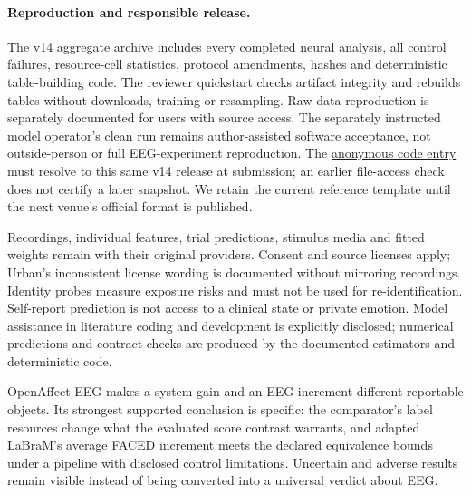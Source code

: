 \documentclass{article}
\begin{document}
\paragraph{Reproduction and responsible release.}
The v14 aggregate archive includes every completed neural analysis, all control
failures, resource-cell statistics, protocol amendments, hashes and deterministic
table-building code. The reviewer quickstart checks artifact integrity and
rebuilds tables without downloads, training or resampling. Raw-data reproduction
is separately documented for users with source access. The separately
instructed model operator's clean run remains author-assisted software
acceptance, not outside-person or full EEG-experiment reproduction. The
\href{https://anonymous.4open.science/\#!/r/OpenAffect-EEG-1815/}{anonymous code entry}
must resolve to this same v14 release at submission; an earlier file-access
check does not certify a later snapshot. We retain the current reference
template until the next venue's official format is published.

Recordings, individual features, trial predictions, stimulus media and fitted
weights remain with their original providers. Consent and source licenses
apply; Urban's inconsistent license wording is documented without mirroring
recordings. Identity probes measure exposure risks and must not be used for
re-identification. Self-report prediction is not access to a clinical state or
private emotion. Model assistance in literature coding and development is
explicitly disclosed; numerical predictions and contract checks are produced
by the documented estimators and deterministic code.

OpenAffect-EEG makes a system gain and an EEG increment different reportable
objects. Its strongest supported conclusion is specific: the comparator's
label resources change what the evaluated score contrast warrants, and
adapted LaBraM's average FACED increment meets the declared equivalence bounds
under a pipeline with disclosed control limitations. Uncertain and adverse
results remain visible instead of being converted into a universal verdict
about EEG.

\label{main-content-end}


\appendix
\setcounter{figure}{0}
\renewcommand{\thefigure}{S\arabic{figure}}
\renewcommand{\theHfigure}{appendix.\arabic{figure}}




\clearpage

\clearpage

\end{document}
